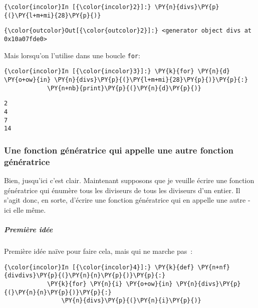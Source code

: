     \begin{Verbatim}[commandchars=\\\{\}]
{\color{incolor}In [{\color{incolor}2}]:} \PY{n}{divs}\PY{p}{(}\PY{l+m+mi}{28}\PY{p}{)}
\end{Verbatim}


\begin{Verbatim}[commandchars=\\\{\}]
{\color{outcolor}Out[{\color{outcolor}2}]:} <generator object divs at 0x10a07fde0>
\end{Verbatim}
            
    Mais lorsqu'on l'utilise dans une boucle \texttt{for}:

    \begin{Verbatim}[commandchars=\\\{\}]
{\color{incolor}In [{\color{incolor}3}]:} \PY{k}{for} \PY{n}{d} \PY{o+ow}{in} \PY{n}{divs}\PY{p}{(}\PY{l+m+mi}{28}\PY{p}{)}\PY{p}{:}
            \PY{n+nb}{print}\PY{p}{(}\PY{n}{d}\PY{p}{)}
\end{Verbatim}


    \begin{Verbatim}[commandchars=\\\{\}]
2
4
7
14

    \end{Verbatim}

    \hypertarget{une-fonction-guxe9nuxe9ratrice-qui-appelle-une-autre-fonction-guxe9nuxe9ratrice}{%
\subsubsection{Une fonction génératrice qui appelle une autre fonction
génératrice}\label{une-fonction-guxe9nuxe9ratrice-qui-appelle-une-autre-fonction-guxe9nuxe9ratrice}}

    Bien, jusqu'ici c'est clair. Maintenant supposons que je veuille écrire
une fonction génératrice qui énumère tous les diviseurs de tous les
diviseurs d'un entier. Il s'agit donc, en sorte, d'écrire une fonction
génératrice qui en appelle une autre - ici elle même.

    \hypertarget{premiuxe8re-iduxe9e}{%
\subparagraph{Première idée}\label{premiuxe8re-iduxe9e}}

    Première idée naïve pour faire cela, mais qui ne marche pas~:

    \begin{Verbatim}[commandchars=\\\{\}]
{\color{incolor}In [{\color{incolor}4}]:} \PY{k}{def} \PY{n+nf}{divdivs}\PY{p}{(}\PY{n}{n}\PY{p}{)}\PY{p}{:}
            \PY{k}{for} \PY{n}{i} \PY{o+ow}{in} \PY{n}{divs}\PY{p}{(}\PY{n}{n}\PY{p}{)}\PY{p}{:}
                \PY{n}{divs}\PY{p}{(}\PY{n}{i}\PY{p}{)}
\end{Verbatim}



